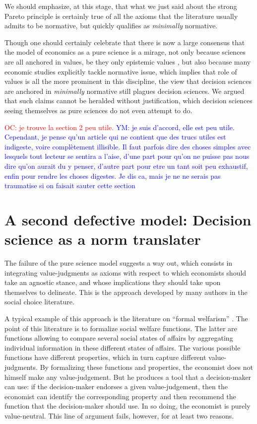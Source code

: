 \documentclass[preprint,11pt]{elsarticle}
\newcommand{\commentYM}[1]{\textcolor{blue}{YM: #1}}
\newcommand{\commentOC}[1]{\textcolor{red}{OC: #1}}
\begin{document}
We should emphasize, at this stage, that what we just said about the strong Pareto principle is certainly true of all the axioms that the literature usually admits to be normative, but quickly qualifies as \emph{minimally} normative.

Though one should certainly celebrate that there is now a large consensus that the model of economics as a pure science is a mirage, not only because sciences are all anchored in values, be they only epistemic values \cite{longino_science_1990}, but also because many economic studies explicitly tackle normative issue, which implies that role of values is all the more prominent in this discipline, the view that decision sciences are anchored in \emph{minimally} normative still plagues decision sciences. We argued that such claims cannot be heralded without justification, which decision sciences seeing themselves as pure sciences do not even attempt to do. 

\commentOC{je trouve la section 2 peu utile.}
\commentYM{je suis d'accord, elle est peu utile. Cependant, je pense qu'un article qui ne contient que des trucs utiles est indigeste, voire complètement illisible. Il faut parfois dire des choses simples avec lesquels tout lecteur se sentira a l'aise, d'une part pour qu'on ne puisse pas nous dire qu'on aurait du y penser, d'autre part pour etre un tant soit peu exhaustif, enfin pour rendre les choses digestes. Je dis ca, mais je ne ne serais pas traumatise si on faisait sauter cette section}

\section{A second defective model: Decision science as a norm translater}
\noindent The failure of the pure science model suggests a way out, which consists in integrating value-judgments as axioms with respect to which economists should take an agnostic stance, and whose implications they should take upon themselves to delineate. This is the approach developed by many authors in the social choice literature.

A typical example of this approach is the literature on ``formal welfarism'' \cite{fleurbaey_informational_2003}. The point of this literature is to formalize social welfare functions. The latter are functions allowing to compare several social states of affairs by aggregating individual information in these different states of affairs. The various possible functions have different properties, which in turn capture different value-judgments. By formalizing these functions and properties, the economist does not himself make any value-judgement. But he produces a tool that a decision-maker can use: if the decision-maker endorses a given value-judgement, then the economist can identify the corresponding property and then recommend the function that the decision-maker should use. In so doing, the economist is purely value-neutral. This line of argument fails, however, for at least two reasons.
\end{document}

